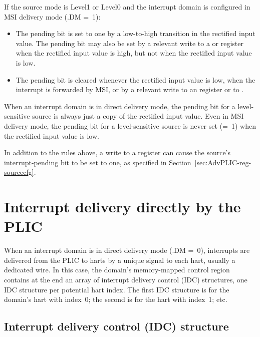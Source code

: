 If the source mode is Level1 or Level0 and the interrupt domain is
configured in MSI delivery mode (.DM =~1):
\begin{itemize}

\item
The pending bit is set to one by a low-to-high transition in the
rectified input value.
The pending bit may also be set by a relevant write to a  or
 register when the rectified input value is high, but not
when the rectified input value is low.

\item
The pending bit is cleared whenever the rectified input value is low,
when the interrupt is forwarded by MSI, or by a relevant write
to an  register or to .

\end{itemize}

\begin{commentary}
When an interrupt domain is in direct delivery mode, the pending bit
for a level-sensitive source is always just a copy of the rectified
input value.
Even in MSI delivery mode, the pending bit for a level-sensitive source
is never set (=~1) when the rectified input value is low.
\end{commentary}

In addition to the rules above, a write to a  register can
cause the source's interrupt-pending bit to be set to one, as specified
in Section~\ref{sec:AdvPLIC-reg-sourcecfg}.

\section{Interrupt delivery directly by the PLIC}
\label{sec:AdvPLIC-directMode}

When an interrupt domain is in direct delivery mode
(.DM =~0), interrupts are delivered from the PLIC to harts
by a unique signal to each hart, usually a dedicated wire.
In this case, the domain's memory-mapped control region contains at the
end an array of interrupt delivery control (IDC) structures, one IDC
structure per potential hart index.
The first IDC structure is for the domain's hart with index~0;
the second is for the hart with index~1; etc.

\subsection{Interrupt delivery control (IDC) structure}
\label{sec:AdvPLIC-IDC}

